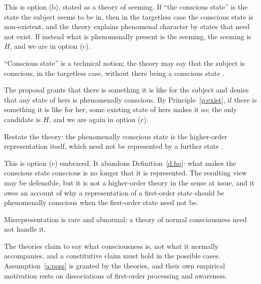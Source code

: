 \documentclass{situationist-preprint}
\begin{document}
\begin{reply}
This is option (b), stated as a theory of seeming. If \enquote{the conscious state} is the state the subject seems to be in, then in the targetless case the conscious state is non-existent, and the theory explains phenomenal character by states that need not exist. If instead what is phenomenally present is the seeming, the seeming is $H$, and we are in option (c).
\end{reply}

\begin{objection}[Weisberg]\label{o:weis}
\enquote{Conscious state} is a technical notion; the theory may say that the subject is conscious, in the targetless case, without there being a conscious state \citep{Weisberg2011}.
\end{objection}

\begin{reply}
The proposal grants that there is something it is like for the subject and denies that any state of hers is phenomenally conscious. By Principle~\ref{p:exist}, if there is something it is like for her, some existing state of hers makes it so; the only candidate is $H$, and we are again in option (c).
\end{reply}

\begin{objection}[Brown]\label{o:brown}
Restate the theory: the phenomenally conscious state is the higher-order representation itself, which need not be represented by a further state \citep{Brown2015}.
\end{objection}

\begin{reply}
This is option (c) embraced. It abandons Definition~\ref{d:ho}: what makes the conscious state conscious is no longer that it is represented. The resulting view may be defensible, but it is not a higher-order theory in the sense at issue, and it owes an account of why a representation of a first-order state should be phenomenally conscious when the first-order state need not be.
\end{reply}

\begin{objection}[Rarity]\label{o:rare}
Misrepresentation is rare and abnormal; a theory of normal consciousness need not handle it.
\end{objection}

\begin{reply}
The theories claim to say what consciousness is, not what it normally accompanies, and a constitutive claim must hold in the possible cases. Assumption~\ref{a:poss} is granted by the theories, and their own empirical motivation rests on dissociations of first-order processing and awareness.
\end{reply}
\end{document}
